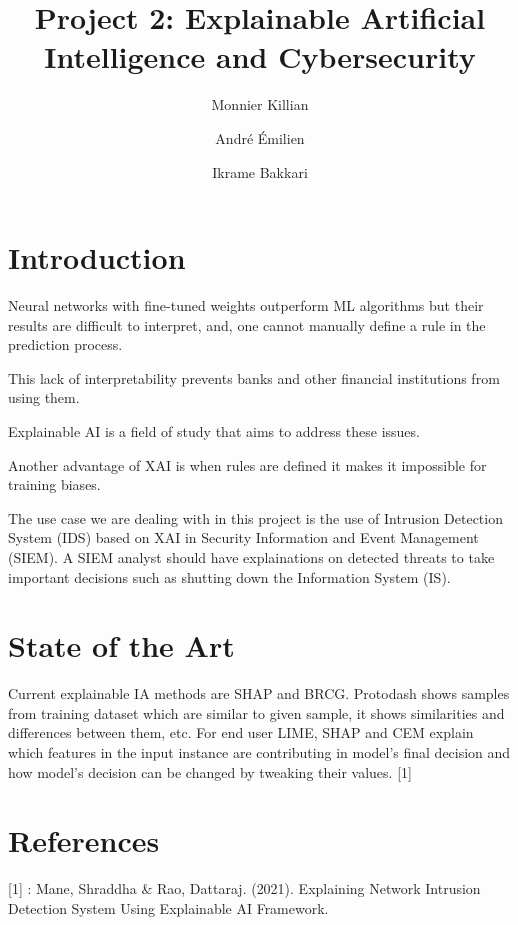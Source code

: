 \documentclass{article}
\author{Monnier Killian\and André Émilien \and Ikrame Bakkari}
\title{Project 2: Explainable Artificial Intelligence and Cybersecurity}
\begin{document}
\maketitle
\section{Introduction}
Neural networks with fine-tuned weights outperform ML algorithms but their results are difficult to interpret, and, one cannot manually define a rule in the prediction process.\par
This lack of interpretability prevents banks and other financial institutions from using them.\par
Explainable AI is a field of study that aims to address these issues.\par
Another advantage of XAI is when rules are defined it makes it impossible for training biases.\par
The use case we are dealing with in this project is the use of Intrusion Detection System (IDS) based on XAI in Security Information and Event Management (SIEM). A SIEM analyst should have explainations on detected threats to take important decisions such as shutting down the Information System (IS).
\section{State of the Art}
Current explainable IA methods are SHAP and BRCG. Protodash shows samples from training dataset which are similar to given sample, it shows similarities and differences between them, etc. For end user LIME, SHAP and CEM explain which features in the input instance are contributing in model's final decision and how model's decision can be changed by tweaking their values. [1]
\section{References}
[1] : Mane, Shraddha \& Rao, Dattaraj. (2021). Explaining Network Intrusion
Detection System Using Explainable AI Framework.
\end{document}
